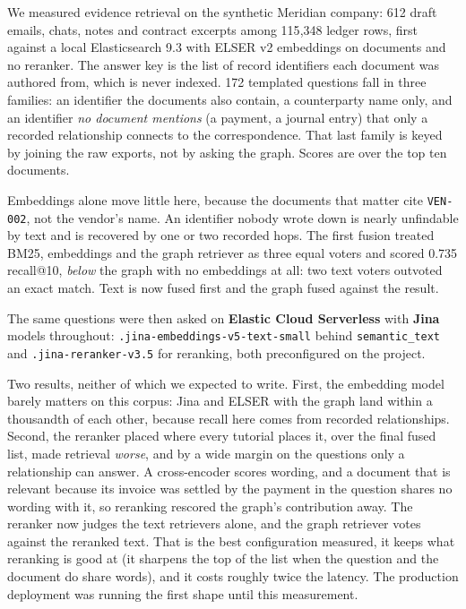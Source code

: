 \documentclass[11pt]{article}
\begin{document}
We measured evidence retrieval on the synthetic Meridian company: 612 draft emails, chats, notes and contract excerpts among 115{,}348 ledger rows, first against a local Elasticsearch 9.3 with ELSER v2 embeddings on documents and no reranker. The answer key is the list of record identifiers each document was authored from, which is never indexed. 172 templated questions fall in three families: an identifier the documents also contain, a counterparty name only, and an identifier \emph{no document mentions} (a payment, a journal entry) that only a recorded relationship connects to the correspondence. That last family is keyed by joining the raw exports, not by asking the graph. Scores are over the top ten documents.

\begin{table}[h]
\centering\small
\liveretrievaltable
\end{table}

\noindent Embeddings alone move little here, because the documents that matter cite \texttt{VEN-002}, not the vendor's name. An identifier nobody wrote down is nearly unfindable by text and is recovered by one or two recorded hops. The first fusion treated BM25, embeddings and the graph retriever as three equal voters and scored 0.735 recall@10, \emph{below} the graph with no embeddings at all: two text voters outvoted an exact match. Text is now fused first and the graph fused against the result. \par\medskip The same questions were then asked on \textbf{Elastic Cloud Serverless} with \textbf{Jina} models throughout: \texttt{.jina-embeddings-v5-text-small} behind \texttt{semantic\_text} and \texttt{.jina-reranker-v3.5} for reranking, both preconfigured on the project.

\begin{table}[h]
\centering\small
\livejinatable
\end{table}

\noindent Two results, neither of which we expected to write. First, the embedding model barely matters on this corpus: Jina and ELSER with the graph land within a thousandth of each other, because recall here comes from recorded relationships. Second, the reranker placed where every tutorial places it, over the final fused list, made retrieval \emph{worse}, and by a wide margin on the questions only a relationship can answer. A cross-encoder scores wording, and a document that is relevant because its invoice was settled by the payment in the question shares no wording with it, so reranking rescored the graph's contribution away. The reranker now judges the text retrievers alone, and the graph retriever votes against the reranked text. That is the best configuration measured, it keeps what reranking is good at (it sharpens the top of the list when the question and the document do share words), and it costs roughly twice the latency. The production deployment was running the first shape until this measurement.
\end{document}
